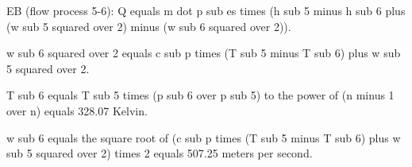 EB (flow process 5-6):
Q equals m dot p sub es times (h sub 5 minus h sub 6 plus (w sub 5 squared over 2) minus (w sub 6 squared over 2)).

w sub 6 squared over 2 equals c sub p times (T sub 5 minus T sub 6) plus w sub 5 squared over 2.

T sub 6 equals T sub 5 times (p sub 6 over p sub 5) to the power of (n minus 1 over n) equals 328.07 Kelvin.

w sub 6 equals the square root of (c sub p times (T sub 5 minus T sub 6) plus w sub 5 squared over 2) times 2 equals 507.25 meters per second.